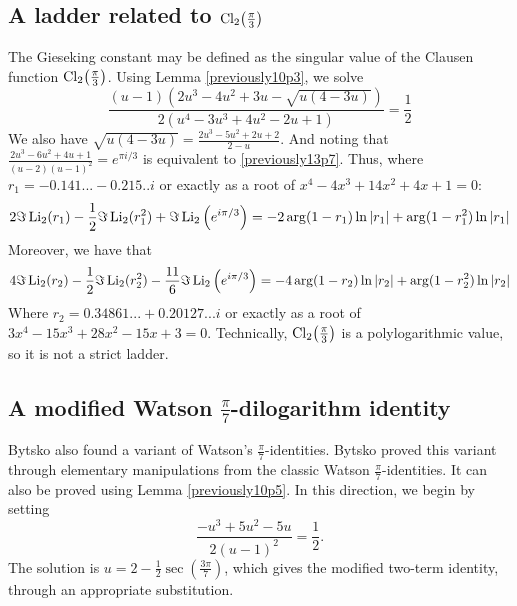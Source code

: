 \documentclass[12pt]{article}
\begin{document}
\subsection{A ladder related to $\rm{Cl}_2\big(\tfrac{\pi}3\big)$}
 The Gieseking constant may be defined as the singular value of the Clausen function $\rm{Cl}_2\big(\tfrac{\pi}3\big)$. Using Lemma 
 \ref{previously10p3}, we solve 
\begin{equation}\label{previously13p7}
 \frac{(u-1) \left(2 u^3 - 4 u^2 + 3 u - \sqrt{u(4 - 3 u)}\right)}{2 \left(u^4 - 3 u^3 + 4 u^2 - 2 u + 1\right)} = \frac{1}{2} 
\end{equation}
 We also have $\sqrt{u (4 - 3u)} = \frac{2u^3 - 5u^2 + 2u + 2}{2 - u}$. And noting that $\frac{2 u^3 - 6 u^2 + 
 4 u + 1}{(u - 2)(u - 1)^2} = e^{\pi i / 3}$ is equivalent to \eqref{previously13p7}. 
 Thus, where $r_1=-0.141... - 0.215.. i$ or exactly as a root of $ x^4 - 4 x^3 + 14 x^2 + 4 x + 1=0$: 
\begin{equation*}
2 \space \Im\operatorname{Li}_2(r_1) - \frac{1}{2} \space\Im\operatorname{Li}_2(r_1^2) + \Im\operatorname{Li}_2\left(e^{i\pi/3}\right) = -2 \arg(1 - r_1) \ln|r_1| + \arg(1 - r_1^2) \ln|r_1|
\end{equation*}
 Moreover, we have that 
\begin{equation*}
4 \space\Im\operatorname{Li}_2(r_2) - 
 \frac{1}{2} \space\Im\operatorname{Li}_2(r_2^2) - 
 \frac{11}{6}\space \Im\operatorname{Li}_2\left(e^{i\pi/3}\right) = -4 \arg(1 - r_2) \ln|r_2| + \arg(1 - r_2^2) \ln|r_2|
\end{equation*}
Where $r_2=0.34861... + 0.20127... i$ or exactly as a root of $3 x^4 - 15 x^3 + 28 x^2 - 15 x + 3 = 0$. Technically, $\rm{Cl}_2\big(\tfrac{\pi}3\big)$ is a polylogarithmic value, so it is not a strict ladder. 

\subsection{A modified Watson $\frac{\pi}{7}$-dilogarithm identity}
 Bytsko \cite{Bytsko1999} also found a variant of Watson's $\frac{\pi}{7}$-identities. Bytsko proved this variant through elementary 
 manipulations from the classic Watson $\frac{\pi}{7}$-identities. It can also be proved using Lemma \ref{previously10p5}. 
 In this direction, we begin by setting 
\begin{equation*}
 \frac{-u^3 + 5u^2 - 5u}{2(u - 1)^2} = \frac{1}{2}. 
\end{equation*}
 The solution is $u = 2 - \frac{1}{2} \sec\left(\frac{3\pi}{7}\right)$, which gives the modified 
 two-term identity, through an appropriate substitution. 
\end{document}
